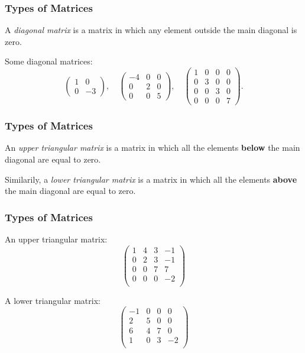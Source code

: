 \begin{frame}
  \frametitle{Types of Matrices}
  A \emph{diagonal matrix} is a matrix in which any element outside the main diagonal is zero.
  \begin{presentation_example}
    Some diagonal matrices:
    \begin{equation*}
      \begin{pmatrix} 1 & 0 \\ 0 & -3 \end{pmatrix},\quad
      \begin{pmatrix} -4 & 0 & 0 \\ 0 & 2 & 0 \\ 0 & 0 & 5 \end{pmatrix},\quad
      \begin{pmatrix} 1 & 0 & 0 & 0 \\ 0 & 3 & 0 & 0 \\ 0 & 0 & 3 & 0 \\ 0 & 0 & 0 & 7 \end{pmatrix}.
    \end{equation*}
  \end{presentation_example}
\end{frame}

\begin{frame}
  \frametitle{Types of Matrices}
  An \emph{upper triangular matrix} is a matrix in which all the elements \textbf{below} the main diagonal are equal to zero.
  
  Similarily, a \emph{lower triangular matrix} is a matrix in which all the elements \textbf{above} the main diagonal are equal to zero.
\end{frame}

\begin{frame}
  \frametitle{Types of Matrices}
  \begin{presentation_example}
    An upper triangular matrix:
    \begin{equation*}
      \begin{pmatrix}
        1 & 4 & 3 & -1 \\
        0 & 2 & 3 & -1 \\
        0 & 0 & 7 & 7 \\
        0 & 0 & 0 & -2 \\
      \end{pmatrix}
    \end{equation*}

    A lower triangular matrix:
    \begin{equation*}
      \begin{pmatrix}
        -1 & 0 & 0 & 0 \\
        2 & 5 & 0 & 0 \\
        6 & 4 & 7 & 0 \\
        1 & 0 & 3 & -2 \\
      \end{pmatrix}
    \end{equation*}
  \end{presentation_example}
\end{frame}

